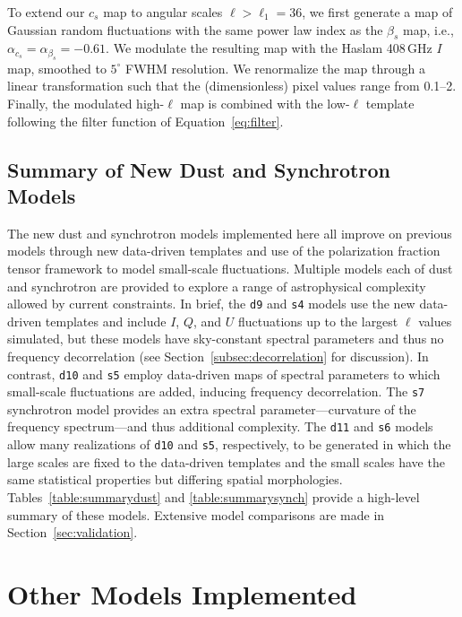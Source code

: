 \documentclass[twocolumn]{aastex631}
\begin{document}
To extend our $c_s$ map to angular scales $\ell > \ell_1 = 36$, we first generate a map of Gaussian random fluctuations with the same power law index as the $\beta_s$ map, i.e., $\alpha _{c_s}=\alpha _{\beta_s} = -0.61$. We modulate the resulting map with the Haslam 408\,GHz $I$ map, smoothed to $5^\circ$ FWHM resolution. We renormalize the map through a linear transformation such that the (dimensionless) pixel values range from 0.1--2. Finally, the modulated high-$\ell$ map is combined with the low-$\ell$ template following the filter function of Equation~\ref{eq:filter}.

\subsection{Summary of New Dust and Synchrotron Models}

The new dust and synchrotron models implemented here all improve on previous models through new data-driven templates and use of the polarization fraction tensor framework to model small-scale fluctuations. Multiple models each of dust and synchrotron are provided to explore a range of astrophysical complexity allowed by current constraints. In brief, the \texttt{d9} and \texttt{s4} models use the new data-driven templates and include $I$, $Q$, and $U$ fluctuations up to the largest $\ell$ values simulated, but these models have sky-constant spectral parameters and thus no frequency decorrelation (see Section~\ref{subsec:decorrelation} for discussion). In contrast, \texttt{d10} and \texttt{s5} employ data-driven maps of spectral parameters to which small-scale fluctuations are added, inducing frequency decorrelation. The \texttt{s7} synchrotron model provides an extra spectral parameter---curvature of the frequency spectrum---and thus additional complexity. The \texttt{d11} and \texttt{s6} models allow many realizations of \texttt{d10} and \texttt{s5}, respectively, to be generated in which the large scales are fixed to the data-driven templates and the small scales have the same statistical properties but differing spatial morphologies. Tables~\ref{table:summarydust} and \ref{table:summarysynch} provide a high-level summary of these models. Extensive model comparisons are made in Section~\ref{sec:validation}.

\section{Other Models Implemented} \label{sec:other_models}
\end{document}
